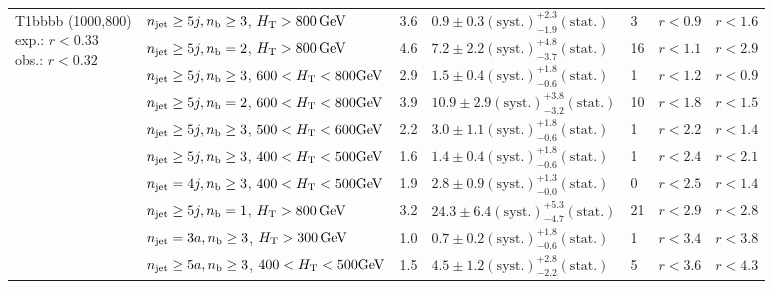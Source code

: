 \begin{table}[h!]
\begin{tabular}{ lllllll }
\multirow{10}{*}{\parbox[t]{2cm}{T1bbbb (1000,800)\\exp.: $r<0.33$\\obs.: $r<0.32$}}
 & $n_{\mathrm{jet}} \geq5j,n_{\text{b}} \geq3$, $\mbox{$H_\text{T}$} > 800 \, \mathrm{GeV}$ & 3.6 & $0.9 \pm 0.3 \mathrm{(syst.)} ^{+2.3}_{-1.9} \mathrm{(stat.)}$ & 3 & $r < 0.9$ & $r < 1.6$\\ 
 & $n_{\mathrm{jet}} \geq5j,n_{\text{b}} =2$, $\mbox{$H_\text{T}$} > 800 \, \mathrm{GeV}$ & 4.6 & $7.2 \pm 2.2 \mathrm{(syst.)} ^{+4.8}_{-3.7} \mathrm{(stat.)}$ & 16 & $r < 1.1$ & $r < 2.9$\\ 
 & $n_{\mathrm{jet}} \geq5j,n_{\text{b}} \geq3$, $600 < \mbox{$H_\text{T}$} < 800 \mathrm{GeV}$ & 2.9 & $1.5 \pm 0.4 \mathrm{(syst.)} ^{+1.8}_{-0.6} \mathrm{(stat.)}$ & 1 & $r < 1.2$ & $r < 0.9$\\ 
 & $n_{\mathrm{jet}} \geq5j,n_{\text{b}} =2$, $600 < \mbox{$H_\text{T}$} < 800 \mathrm{GeV}$ & 3.9 & $10.9 \pm 2.9 \mathrm{(syst.)} ^{+3.8}_{-3.2} \mathrm{(stat.)}$ & 10 & $r < 1.8$ & $r < 1.5$\\ 
 & $n_{\mathrm{jet}} \geq5j,n_{\text{b}} \geq3$, $500 < \mbox{$H_\text{T}$} < 600 \mathrm{GeV}$ & 2.2 & $3.0 \pm 1.1 \mathrm{(syst.)} ^{+1.8}_{-0.6} \mathrm{(stat.)}$ & 1 & $r < 2.2$ & $r < 1.4$\\ 
 & $n_{\mathrm{jet}} \geq5j,n_{\text{b}} \geq3$, $400 < \mbox{$H_\text{T}$} < 500 \mathrm{GeV}$ & 1.6 & $1.4 \pm 0.4 \mathrm{(syst.)} ^{+1.8}_{-0.6} \mathrm{(stat.)}$ & 1 & $r < 2.4$ & $r < 2.1$\\ 
 & $n_{\mathrm{jet}} =4j,n_{\text{b}} \geq3$, $400 < \mbox{$H_\text{T}$} < 500 \mathrm{GeV}$ & 1.9 & $2.8 \pm 0.9 \mathrm{(syst.)} ^{+1.3}_{-0.0} \mathrm{(stat.)}$ & 0 & $r < 2.5$ & $r < 1.4$\\ 
 & $n_{\mathrm{jet}} \geq5j,n_{\text{b}} =1$, $\mbox{$H_\text{T}$} > 800 \, \mathrm{GeV}$ & 3.2 & $24.3 \pm 6.4 \mathrm{(syst.)} ^{+5.3}_{-4.7} \mathrm{(stat.)}$ & 21 & $r < 2.9$ & $r < 2.8$\\ 
 & $n_{\mathrm{jet}} =3a,n_{\text{b}} \geq3$, $\mbox{$H_\text{T}$} > 300 \, \mathrm{GeV}$ & 1.0 & $0.7 \pm 0.2 \mathrm{(syst.)} ^{+1.8}_{-0.6} \mathrm{(stat.)}$ & 1 & $r < 3.4$ & $r < 3.8$\\ 
 & $n_{\mathrm{jet}} \geq5a,n_{\text{b}} \geq3$, $400 < \mbox{$H_\text{T}$} < 500 \mathrm{GeV}$ & 1.5 & $4.5 \pm 1.2 \mathrm{(syst.)} ^{+2.8}_{-2.2} \mathrm{(stat.)}$ & 5 & $r < 3.6$ & $r < 4.3$\\ \hline
    \hline
  \end{tabular}
\end{table}

